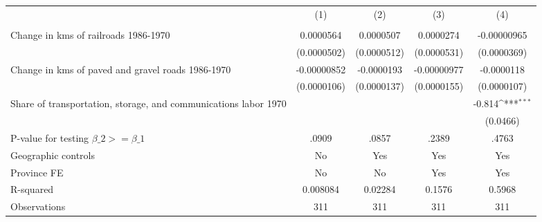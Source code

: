 {
\def\sym#1{\ifmmode^{#1}\else\(^{#1}\)\fi}
\begin{tabular}{l*{4}{c}}
\hline\hline
                &\multicolumn{1}{c}{(1)}&\multicolumn{1}{c}{(2)}&\multicolumn{1}{c}{(3)}&\multicolumn{1}{c}{(4)}\\
                &\multicolumn{1}{c}{}&\multicolumn{1}{c}{}&\multicolumn{1}{c}{}&\multicolumn{1}{c}{}\\
\hline
Change in kms of railroads 1986-1970&0.0000564         &0.0000507         &0.0000274         &-0.00000965         \\
                &(0.0000502)         &(0.0000512)         &(0.0000531)         &(0.0000369)         \\
[1em]
Change in kms of paved and gravel roads 1986-1970&-0.00000852         &-0.0000193         &-0.00000977         &-0.0000118         \\
                &(0.0000106)         &(0.0000137)         &(0.0000155)         &(0.0000107)         \\
[1em]
Share of transportation, storage, and communications labor 1970&                  &                  &                  &   -0.814\sym{***}\\
                &                  &                  &                  & (0.0466)         \\
\hline
P-value for testing $\beta\_{2} >= \beta\_{1}$&    .0909         &    .0857         &    .2389         &    .4763         \\
Geographic controls&       No         &      Yes         &      Yes         &      Yes         \\
Province FE     &       No         &       No         &      Yes         &      Yes         \\
R-squared       & 0.008084         &  0.02284         &   0.1576         &   0.5968         \\
Observations    &      311         &      311         &      311         &      311         \\
\hline\hline
\end{tabular}
}
